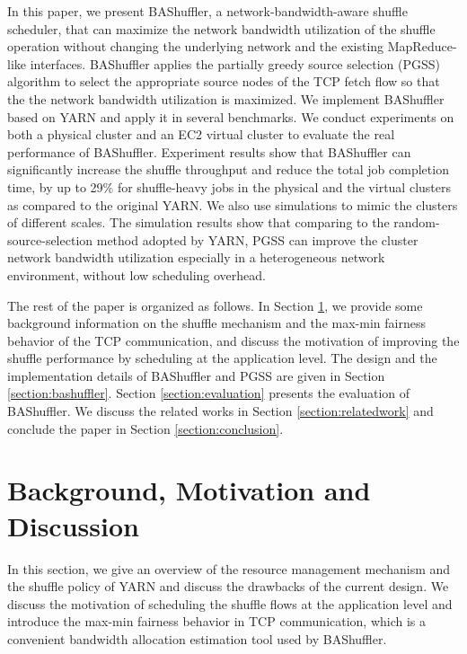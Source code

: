\documentclass[10pt,journal,compsoc]{IEEEtran}
\begin{document}
In this paper, 
we present BAShuffler, a network-bandwidth-aware shuffle scheduler, 
that can maximize the network bandwidth utilization of the shuffle operation
without changing the underlying network and the existing MapReduce-like interfaces. 
BAShuffler applies the partially
greedy source selection (PGSS) algorithm
to select the appropriate source nodes of the TCP fetch flow so that 
the the network bandwidth utilization is maximized. 
We implement BAShuffler based on YARN and apply it in
several benchmarks.
We conduct experiments on both a physical cluster and an EC2
virtual cluster to evaluate the real performance of BAShuffler. 
Experiment results show that BAShuffler can significantly increase the
shuffle throughput
and reduce the total job completion time, by up to 29\% for
shuffle-heavy jobs in the physical and the virtual clusters
as compared to the original YARN. 
We also use simulations to mimic the clusters of different scales. 
The simulation results show that comparing to the
random-source-selection method adopted by YARN, 
PGSS can improve the cluster network bandwidth
utilization especially in a heterogeneous network environment, without low scheduling overhead.


The rest of the paper is organized as follows.
In Section \ref{section:background}, we provide some background information on the shuffle mechanism
and the max-min fairness behavior of the TCP communication, and discuss the motivation of improving the shuffle performance by scheduling at the application level.
The design and the implementation details of BAShuffler and PGSS
are given in Section \ref{section:bashuffler}.
Section \ref{section:evaluation} presents the evaluation of BAShuffler.
We discuss the related works in Section \ref{section:relatedwork} and
conclude the paper in Section \ref{section:conclusion}. 



\section{Background, Motivation and Discussion}\label{section:background}
In this section, we give an overview of the resource management mechanism
and the shuffle policy of YARN and discuss the drawbacks of the current design. 
We discuss the motivation of scheduling the shuffle flows at the application level
and introduce the max-min fairness behavior in TCP communication, which is
a convenient bandwidth allocation estimation tool used by BAShuffler. 
\end{document}

